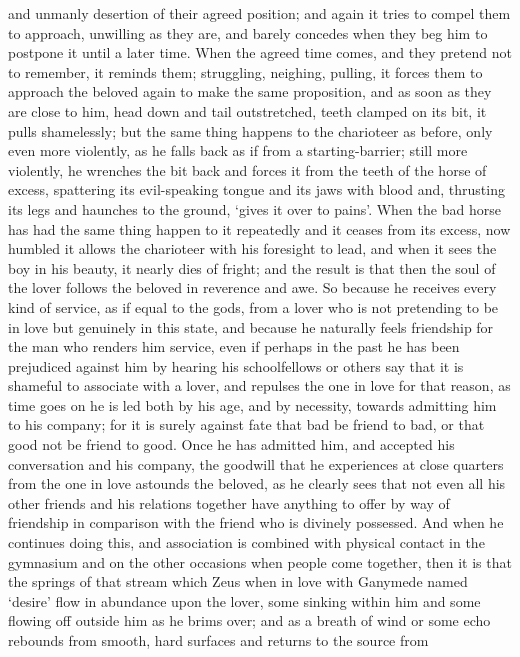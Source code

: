 and unmanly desertion of their agreed position; and again  it
tries to compel them to approach, unwilling as they are, and barely
concedes when they beg him to postpone it until a later time. When the
agreed time comes, and they pretend not to  remember, it reminds
them; struggling, neighing, pulling, it forces them to approach the
beloved again to make the same proposition, and as soon as they are
close to him, head down and tail outstretched, teeth clamped on its bit,
it pulls shamelessly;  but the same thing happens to the
charioteer as before, only even more violently, as he falls back as if
from a starting-barrier; still more violently,
he wrenches the bit back and forces it from the teeth of the horse of
excess, spattering its evil-speaking tongue and its jaws with blood and,
thrusting its  legs and haunches to the ground, ‘gives it over
to pains'. When the bad
horse has had the same thing happen to it repeatedly and it ceases from
its excess, now humbled it allows the charioteer with his foresight to
lead, and when it sees the boy in his beauty, it nearly dies of fright;
and the result is that then  the soul of the lover follows the
beloved in reverence and awe. So because he receives every kind of
service, as if equal to the gods, from a lover who is not pretending to
be in love but genuinely in this state, and because he naturally feels
friendship for the man who renders him service, even if perhaps in the
 past he has been prejudiced against him by hearing his
schoolfellows or others say that it is shameful to associate with a
lover, and repulses the one in love for that reason, as time goes on he
 is led both by his age, and by necessity, towards admitting him
to his company; for it is surely against fate that bad be friend to bad,
or that good not be friend to good. Once he has admitted him, and
accepted his conversation and his company, the goodwill that he
experiences at close quarters from the one in love  astounds the
beloved, as he clearly sees that not even all his other friends and his
relations together have anything to offer by way of friendship in
comparison with the friend who is divinely possessed. And when he
continues doing this, and association is combined with physical contact
in the gymnasium  and on the other occasions when people come
together, then it is that the springs of that stream which Zeus when in
love with Ganymede named
‘desire' flow in
abundance upon the lover, some sinking within him and some flowing off
outside him as he brims over; and as a breath of wind or some echo
rebounds from smooth, hard surfaces and returns to the source from
